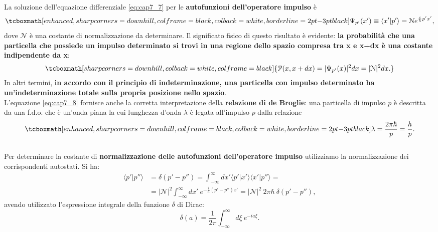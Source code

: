 \documentclass[a4paper,12pt,oneside]{book}
\begin{document}
La soluzione dell'equazione differenziale \eqref{eq:cap7_7} per le \textbf{autofunzioni dell'operatore impulso} è
	\begin{equation}
		\label{eq:cap7_8}
		\tcboxmath[enhanced, sharp corners=downhill, colframe=black, colback=white, borderline={2pt}{-3pt}{black}]{
			\Psi_{p'}(x') \equiv \langle x' | p' \rangle = \mathcal{N} e^{\frac{i}{\hbar}p'x'},
			}
	\end{equation}
dove $\mathcal{N}$ è una costante di normalizzazione da determinare. Il significato fisico di questo risultato è evidente: \textbf{la probabilità che una particella che possiede un impulso determinato si trovi in una regione dello spazio compresa tra x e x+dx è una costante indipendente da x}:
	\begin{equation}
		\tcboxmath[sharp corners=downhill, colback=white, colframe=black]{
			\mathcal{P}(x,x+dx) = |\Psi_{p'}(x)|^2 dx = |\mathcal{N}|^2 dx.
			}
	\end{equation}
\noindent In altri termini, \textbf{in accordo con il principio di indeterminazione, una particella con impulso determinato ha un'indeterminazione totale sulla propria posizione nello spazio}.\\

L'equazione \eqref{eq:cap7_8} fornisce anche la corretta interpretazione della \textbf{relazione di de Broglie}: una particella di impulso $p$ è descritta da una f.d.o. che è un'onda piana la cui lunghezza d'onda $\lambda$ è legata all'impulso $p$ dalla relazione
	\begin{equation}
		\tcboxmath[enhanced, sharp corners=downhill, colframe=black, colback=white, borderline={2pt}{-3pt}{black}]{
			\lambda = \frac{2 \pi \hbar}{p} = \frac{h}{p}.
			}
	\end{equation}\\
	
Per determinare la costante di \textbf{normalizzazione delle autofunzioni dell'operatore impulso} utilizziamo la normalizzazione dei corrispondenti autostati. Si ha:
	\begin{align}
		\langle p'\vert p'' \rangle &= \delta \left( p' -p''\right) =\int _{-\infty}	 ^{\infty} dx' \langle p' \vert x' \rangle \langle x' \vert p'' \rangle = \nonumber \\
		&= \vert\mathcal{N} \vert ^2 \int _{-\infty}	 ^{\infty} dx' \ e^{-\frac{i}{\hbar} \left( p'-p''\right) x'} = \vert\mathcal{N} \vert ^2\ 2 \pi \hbar\ \delta\left(p' -p'' \right),
	\end{align}
avendo utilizzato l'espressione integrale della funzione $\delta$ di Dirac:
	\begin{equation}
		\delta \left( a \right) =\frac{1}{2\pi}\int _{-\infty} ^{\infty} d\xi \ e^{-ia\xi}.
	\end{equation}\\
\end{document}
